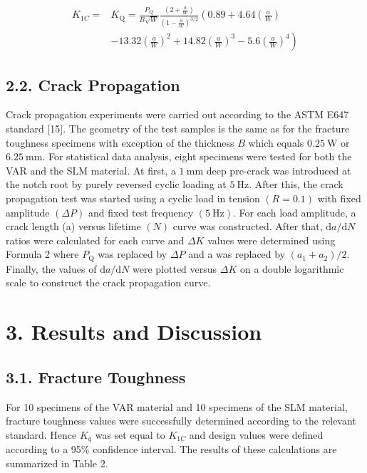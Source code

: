 \documentclass[10pt]{article}
\begin{document}
\begin{align*}
K_{1 C}= & K_{\mathrm{Q}}=\frac{P_{\mathrm{Q}}}{B \sqrt{W}} \frac{\left(2+\frac{a}{W}\right)}{\left(1-\frac{a}{W}\right)^{3 / 2}}\left(0.89+4.64\left(\frac{a}{W}\right)\right.  \tag{2}\\
& \left.-13.32\left(\frac{a}{W}\right)^{2}+14.82\left(\frac{a}{W}\right)^{3}-5.6\left(\frac{a}{W}\right)^{4}\right)
\end{align*}


\subsection*{2.2. Crack Propagation}
Crack propagation experiments were carried out according to the ASTM E647 standard [15]. The geometry of the test samples is the same as for the fracture toughness specimens with exception of the thickness $B$ which equals $0.25 \mathrm{~W}$ or $6.25 \mathrm{~mm}$. For statistical data analysis, eight specimens were tested for both the VAR and the SLM material. At first, a $1 \mathrm{~mm}$ deep pre-crack was introduced at the notch root by purely reversed cyclic loading at $5 \mathrm{~Hz}$. After this, the crack propagation test was started using a cyclic load in tension $(R=0.1)$ with fixed amplitude $(\Delta P)$ and fixed test frequency $(5 \mathrm{~Hz})$. For each load amplitude, a crack length (a) versus lifetime $(N)$ curve was constructed. After that, $\mathrm{d} a / \mathrm{d} N$ ratios were calculated for each curve and $\Delta K$ values were determined using Formula 2 where $P_{\mathrm{Q}}$ was replaced by $\Delta P$ and a was replaced by $\left(a_{1}+a_{2}\right) / 2$. Finally, the values of $\mathrm{d} a / \mathrm{d} N$ were plotted versus $\Delta K$ on a double logarithmic scale to construct the crack propagation curve.

\section*{3. Results and Discussion}
\subsection*{3.1. Fracture Toughness}
For 10 specimens of the VAR material and 10 specimens of the SLM material, fracture toughness values were successfully determined according to the relevant standard. Hence $K_{q}$ was set equal to $K_{1 C}$ and design values were defined according to a 95\% confidence interval. The results of these calculations are summarized in Table 2.
\end{document}
